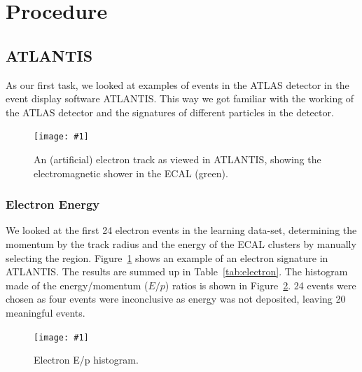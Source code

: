 \documentclass[twocolumn]{article}
\newcommand{\insertFigure}[1]{%
   \texttt{[image: \#1]}%
}
\begin{document}
\section{Procedure} \label{sec:Proc}
\subsection{ATLANTIS}
As our first task, we looked at examples of events in the ATLAS detector in the event display software ATLANTIS. This way we got familiar with the working of the ATLAS detector and the signatures of different particles in the detector.
\begin{figure} [!h]
	\centering
	\insertFigure{Images/Atlantis_Electron_cropped.png}
	\caption{An (artificial) electron track as viewed in ATLANTIS, showing the electromagnetic shower in the ECAL (green).}
	\label{fig:elec}
\end{figure}

\subsubsection{Electron Energy}
We looked at the first 24 electron events in the learning data-set, determining the momentum by the track radius and the energy of the ECAL clusters by manually selecting the region. Figure~\ref{fig:elec} shows an example of an electron signature in ATLANTIS. The results are summed up in Table~\ref{tab:electron}. The histogram made of the energy/momentum ($E/p$) ratios is shown in Figure~\ref{fig:electron_histogram}. 24 events were chosen as four events were inconclusive as energy was not deposited, leaving 20 meaningful events.
\begin{figure} [!h]
\centering
\insertFigure{Images/electron_histogram.png}
\caption{Electron E/p histogram.}
\label{fig:electron_histogram}
\end{figure}
\end{document}
